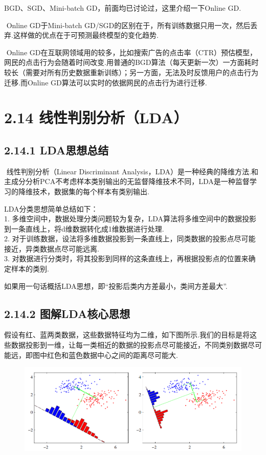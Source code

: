 BGD、SGD、Mini-batch GD，前面均已讨论过，这里介绍一下Online GD.

​ Online GD于Mini-batch
GD/SGD的区别在于，所有训练数据只用一次，然后丢弃.这样做的优点在于可预测最终模型的变化趋势.

​ Online
GD在互联网领域用的较多，比如搜索广告的点击率（CTR）预估模型，网民的点击行为会随着时间改变.用普通的BGD算法（每天更新一次）一方面耗时较长（需要对所有历史数据重新训练）；另一方面，无法及时反馈用户的点击行为迁移.而Online
GD算法可以实时的依据网民的点击行为进行迁移.

\section{2.14
线性判别分析（LDA）}\label{ux7ebfux6027ux5224ux522bux5206ux6790lda}

\subsection{2.14.1 LDA思想总结}\label{ldaux601dux60f3ux603bux7ed3}

​ 线性判别分析（Linear Discriminant
Analysis，LDA）是一种经典的降维方法.和主成分分析PCA不考虑样本类别输出的无监督降维技术不同，LDA是一种监督学习的降维技术，数据集的每个样本有类别输出.

LDA分类思想简单总结如下：\\
1.
多维空间中，数据处理分类问题较为复杂，LDA算法将多维空间中的数据投影到一条直线上，将d维数据转化成1维数据进行处理.\\
2.
对于训练数据，设法将多维数据投影到一条直线上，同类数据的投影点尽可能接近，异类数据点尽可能远离.\\
3.
对数据进行分类时，将其投影到同样的这条直线上，再根据投影点的位置来确定样本的类别.

如果用一句话概括LDA思想，即``投影后类内方差最小，类间方差最大''.

\subsection{2.14.2
图解LDA核心思想}\label{ux56feux89e3ldaux6838ux5fc3ux601dux60f3}

​
假设有红、蓝两类数据，这些数据特征均为二维，如下图所示.我们的目标是将这些数据投影到一维，让每一类相近的数据的投影点尽可能接近，不同类别数据尽可能远，即图中红色和蓝色数据中心之间的距离尽可能大.

\begin{figure}
\centering
\includegraphics{./img/ch2/2.29/1.png}
\caption{}
\end{figure}

